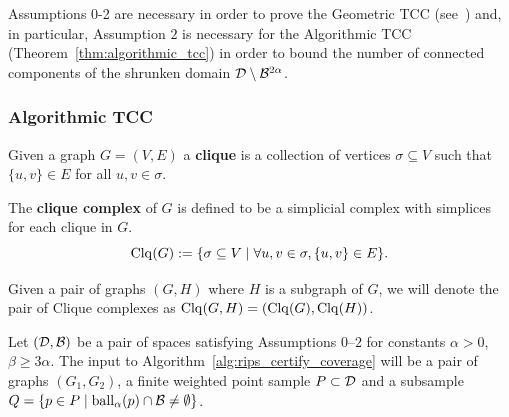 Assumptions 0-2 are necessary in order to prove the Geometric TCC (see~\cite{cavanna17when}) and, in particular, Assumption $2$ is necessary for the Algorithmic TCC (Theorem~\ref{thm:algorithmic_tcc}) in order to bound the number of connected components of the shrunken domain ${\mathcal{D}}\setminus{\mathcal{B}}^{2\alpha}$.

\subsubsection{Algorithmic TCC}

Given a graph $G = (V, E)$ a \textbf{clique} is a collection of vertices $\sigma\subseteq V$ such that $\{u,v\}\in E$ for all $u,v\in\sigma$.
\begin{definition}
    The \textbf{clique complex} of $G$ is defined to be a simplicial complex with simplices for each clique in $G$.
    \[ \mathrm{Clq}(G) := \{ \sigma\subseteq V\mid \forall u,v\in\sigma, \{u,v\}\in E \}. \]

    Given a pair of graphs $(G, H)$ where $H$ is a subgraph of $G$, we will denote the pair of Clique complexes as $\mathrm{Clq}(G,H) = (\mathrm{Clq}(G),\mathrm{Clq}(H))$.
\end{definition}

Let $({\mathcal{D}},{\mathcal{B}})$ be a pair of spaces satisfying Assumptions $0$--$2$ for constants $\alpha > 0$, $\beta\geq 3\alpha$.
The input to Algorithm~\ref{alg:rips_certify_coverage} will be a pair of graphs $(G_1, G_2)$, a finite weighted point sample $P\subset {\mathcal{D}}$ and a subsample $Q=\{p\in P\mid \mathrm{ball}_\alpha(p)\cap{\mathcal{B}} \neq \emptyset\}$.

